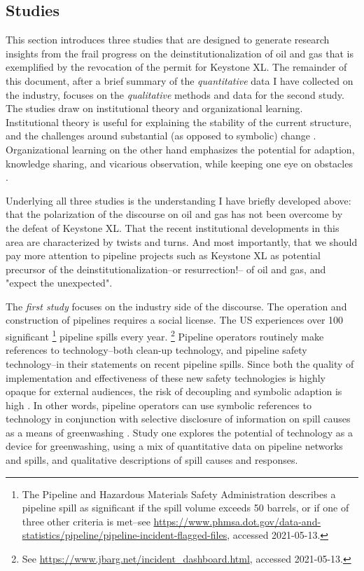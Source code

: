 
\subsection*{Studies}

This section introduces three studies that are designed to generate research insights from the frail progress on the deinstitutionalization of oil and gas that is exemplified by the revocation of the permit for Keystone XL. The remainder of this document, after a brief summary of the \textit{quantitative} data I have collected on the industry, focuses on the \textit{qualitative} methods and data for the second study. The studies draw on institutional theory and organizational learning. Institutional theory is useful for explaining the stability of the current structure, and the challenges around substantial (as opposed to symbolic) change \citep{Meyer1977,Hoffman2015}. Organizational learning on the other hand emphasizes the potential for adaption, knowledge sharing, and vicarious observation, while keeping one eye on obstacles \citep{Madsen2010,Madsen2018,Rerup2021}.

Underlying all three studies is the understanding I have briefly developed above: that the polarization of the discourse on oil and gas has not been overcome by the defeat of Keystone XL. That the recent institutional developments in this area are characterized by twists and turns. And most importantly, that we should pay more attention to pipeline projects such as Keystone XL as potential precursor of the deinstitutionalization--or resurrection!-- of oil and gas, and "expect the unexpected".

The \textit{first study} focuses on the industry side of the discourse. The operation and construction of pipelines requires a social license. The US experiences over 100 significant
\footnote{The Pipeline and Hazardous Materials Safety Administration describes a pipeline spill as significant if the spill volume exceeds 50 barrels, or if one of three other criteria is met--see \url{https://www.phmsa.dot.gov/data-and-statistics/pipeline/pipeline-incident-flagged-files}, accessed 2021-05-13.} 
pipeline spills every year.
\footnote{See \url{https://www.jbarg.net/incident_dashboard.html}, accessed 2021-05-13.} Pipeline operators routinely make references to technology--both clean-up technology, and pipeline safety technology--in their statements on recent pipeline spills. Since both the quality of implementation and effectiveness of these new safety technologies is highly opaque for external audiences, the risk of decoupling and symbolic adaption is high \citep{Wijen2014a}. In other words, pipeline operators can use symbolic references to technology in conjunction with selective disclosure of information on spill causes as a means of greenwashing \citep{Lyon2015}. Study one explores the potential of technology as a device for greenwashing, using a mix of quantitative data on pipeline networks and spills, and qualitative descriptions of spill causes and responses.

